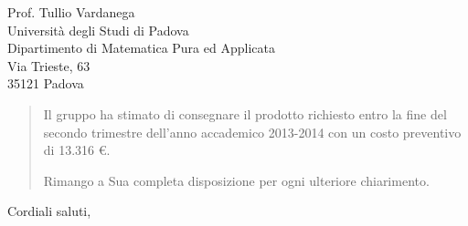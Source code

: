 \documentclass{letter}
\begin{document}
\begin{letter}{
	Prof. Tullio Vardanega \\
	Università degli Studi di Padova \\
	Dipartimento di Matematica Pura ed Applicata \\
	Via Trieste, 63 \\
	35121 Padova
}
\begin{quotation}
\begin{itemize}
	\end{itemize}

	Il gruppo \GroupName{} ha stimato di consegnare il prodotto richiesto entro la fine del secondo trimestre dell'anno accademico 2013-2014 con un costo preventivo di 13.316 \euro.

	Rimango a Sua completa disposizione per ogni ulteriore chiarimento.

\end{quotation}

\closing{Cordiali saluti,}


\end{letter}
\end{document}
